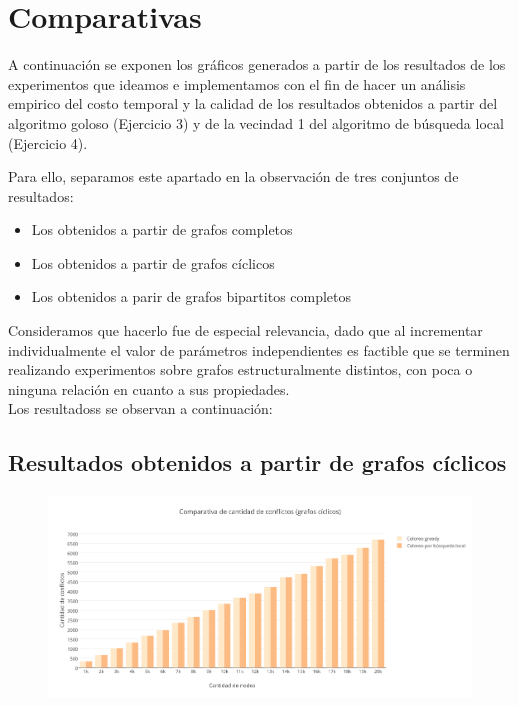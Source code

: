 \section{Comparativas}

A continuación se exponen los gráficos generados a partir de los resultados de los experimentos que ideamos e implementamos con el fin de hacer un análisis empirico del costo temporal y la calidad de los resultados obtenidos a partir del algoritmo goloso (Ejercicio 3) y de la vecindad 1 del algoritmo de búsqueda local (Ejercicio 4). 

Para ello, separamos este apartado en la observación de tres conjuntos de resultados:

\begin{itemize}
\item {Los obtenidos a partir de grafos completos}
\item {Los obtenidos a partir de grafos cíclicos}
\item {Los obtenidos a parir de grafos bipartitos completos}
\end{itemize}

Consideramos que hacerlo fue de especial relevancia, dado que al incrementar individualmente el valor de parámetros independientes es factible que se terminen realizando experimentos sobre grafos estructuralmente distintos, con poca o ninguna relación en cuanto a sus propiedades.\\
Los resultadoss se observan a continuación:\\


\subsection {Resultados obtenidos a partir de grafos cíclicos} 

 \begin{figure}[H]
    \begin{center}
  	\includegraphics[width=18cm]{imagenes/Ej5/ComparacionConflictosCiclico.png}
 	\label{ComparacionConflictosCiclico}
    \end{center}
  \end{figure}

